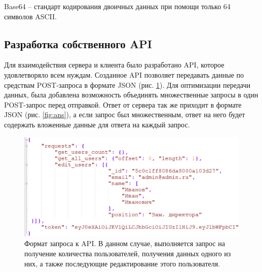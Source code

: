 \documentclass[14pt, a4paper]{extarticle}
\begin{document}
    Base64 – стандарт кодирования двоичных данных при помощи только 64 символов ASCII.


    \clearpage
    \subsection{Разработка собственного API}
    Для взаимодействия сервера и клиента было разработано API, которое удовлетворяло всем нуждам. Созданное API позволяет передавать данные по средствам POST-запроса в формате JSON (рис. \ref{fig:req}). Для оптимизации передачи данных, была добавлена возможность объединять множественные запросы в один POST-запрос перед отправкой. Ответ от сервера так же приходит в формате JSON (рис. \ref{fig:ans}), а если запрос был множественным, ответ на него будет содержать вложенные данные для ответа на каждый запрос.
    
    \begin{figure}[h]
        \centering
        \includegraphics[width=1\linewidth]{img/req.png}
        \caption{Формат запроса к API. В данном случае, выполняется запрос на получение количества пользователей, получения данных одного из них, а также последующие редактирование этого пользователя.}
        \label{fig:req}
    \end{figure}
    
\end{document}
